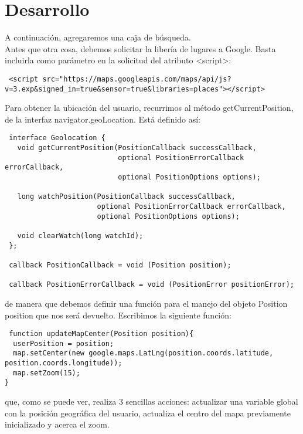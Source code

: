 \section{Desarrollo}

A continuación, agregaremos una caja de búsqueda. 
\\
Antes que otra cosa, debemos solicitar la libería de lugares a Google. Basta incluirla como parámetro en la solicitud del atributo <script>:

\begin{lstlisting}
 <script src="https://maps.googleapis.com/maps/api/js?v=3.exp&signed_in=true&sensor=true&libraries=places"></script>
 \end{lstlisting}

 Para obtener la ubicación del usuario, recurrimos al método getCurrentPosition, de la interfaz navigator.geoLocation. Está definido así:

\begin{lstlisting}
 interface Geolocation { 
   void getCurrentPosition(PositionCallback successCallback,
                           optional PositionErrorCallback errorCallback,
                           optional PositionOptions options);

   long watchPosition(PositionCallback successCallback,
                      optional PositionErrorCallback errorCallback,
                      optional PositionOptions options);

   void clearWatch(long watchId);
 };

 callback PositionCallback = void (Position position);

 callback PositionErrorCallback = void (PositionError positionError);
 \end{lstlisting}

 de manera que debemos definir una función para el manejo del objeto Position position que nos será devuelto. Escribimos la siguiente función:

 \begin{lstlisting}
 function updateMapCenter(Position position){
  userPosition = position;
  map.setCenter(new google.maps.LatLng(position.coords.latitude, position.coords.longitude));
  map.setZoom(15);
}
\end{lstlisting}

que, como se puede ver, realiza 3 sencillas acciones: actualizar una variable global con la posición geográfica del usuario, actualiza el centro del mapa previamente inicializado y acerca el zoom.



